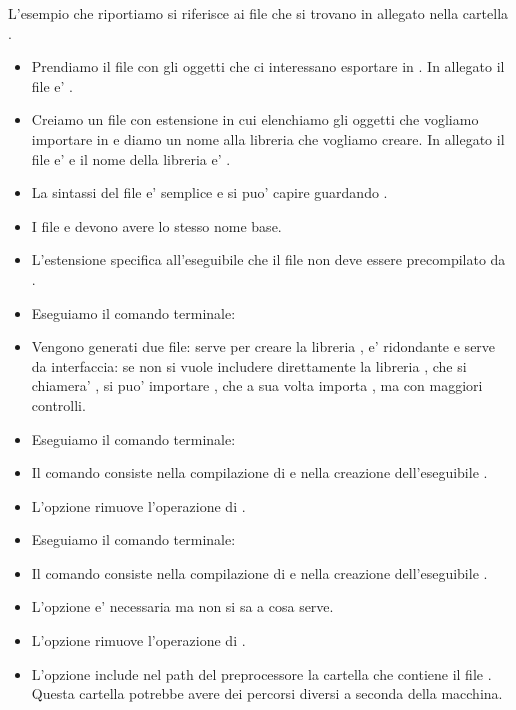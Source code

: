 L'esempio che riportiamo si riferisce ai file che si trovano in allegato nella cartella .

\begin{itemize}
\item[\bbox] Prendiamo il file  con gli oggetti che ci interessano esportare in . In allegato il file e' .
\item[\bbox] Creiamo un file con estensione  in cui elenchiamo gli oggetti che vogliamo importare in  e diamo un nome alla libreria  che vogliamo creare. In allegato il file e'  e il nome della libreria e' .
\item[] La sintassi del file  e' semplice e si puo' capire guardando .
\item[] I file  e  devono avere lo stesso nome base.
\item[] L'estensione  specifica all'eseguibile  che il file non deve essere precompilato da .
\item[\bbox] Eseguiamo il comando terminale:\par
{}
\item[] Vengono generati due file:  serve per creare la libreria ,  e' ridondante e serve da interfaccia: se non si vuole includere direttamente la libreria , che si chiamera' , si puo' importare , che a sua volta importa , ma con maggiori controlli.
\item[\bbox] Eseguiamo il comando terminale:\par
{}
\item[] Il comando consiste nella compilazione di  e nella creazione dell'eseguibile .
\item[] L'opzione  rimuove l'operazione di .
\item[\bbox] Eseguiamo il comando terminale:\par
{}
\item[] Il comando consiste nella compilazione di  e nella creazione dell'eseguibile .
\item[] L'opzione  e' necessaria ma non si sa a cosa serve.
\item[] L'opzione  rimuove l'operazione di .
\item[] L'opzione  include nel path del preprocessore  la cartella che contiene il file . Questa cartella potrebbe avere dei percorsi diversi a seconda della macchina.

\end{itemize}
